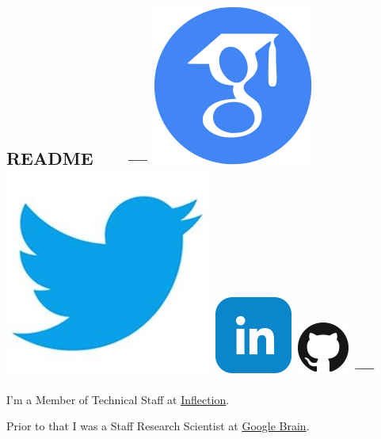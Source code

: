 \documentclass{article}
\begin{document}
\subsection*{README \ \ \ --- \protect
\href{https://scholar.google.com/citations?user=IMkVH_8AAAAJ&hl=en}{\includegraphics[natwidth=22, natheight=22]{img/google-scholar.png}}
\href{https://twitter.com/Hanxiao_6}{\includegraphics[natwidth=22, natheight=22]{img/twitter.jpg}}
\href{https://www.linkedin.com/in/hanxiao-liu-17194a4a/}{\includegraphics[natwidth=22, natheight=22]{img/linkedin.png}}
\href{https://github.com/quark0}{\includegraphics[natwidth=22, natheight=22]{img/GitHub-Mark-64px.png}}
---
}
I'm a Member of Technical Staff at \href{https://inflection.ai}{Inflection}.

Prior to that I was a Staff Research Scientist at \href{https://ai.google/research/teams/brain}{Google Brain}.
\end{document}
